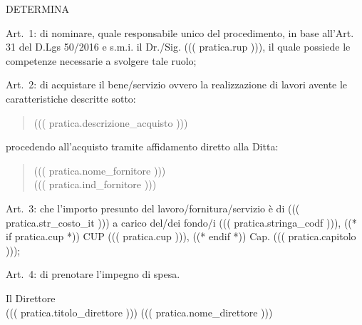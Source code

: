 \documentclass[a4paper,12pt]{letter}
\begin{document}
\begin{center}
DETERMINA
\end{center}

\begin{list}{VALUTATA}{}
\item[Art.~1:] di nominare, quale responsabile unico del procedimento, in base 
           all'Art. 31 del D.Lgs 50/2016 e s.m.i. il Dr./Sig. ((( pratica.rup ))),
           il quale possiede le competenze necessarie a svolgere tale ruolo; 
\item[Art.~2:] di acquistare il bene/servizio ovvero la realizzazione di lavori
        avente le caratteristiche descritte sotto:
\begin{quote}
            ((( pratica.descrizione_acquisto )))
\end{quote}

procedendo all'acquisto tramite affidamento diretto alla Ditta: 

\begin{quote}
((( pratica.nome_fornitore )))\\
((( pratica.ind_fornitore )))
\end{quote}


\item[Art.~3:] che l'importo presunto del lavoro/fornitura/servizio è di 
((( pratica.str_costo_it )))
a carico del/dei fondo/i ((( pratica.stringa_codf ))), ((* if pratica.cup *)) CUP ((( pratica.cup ))), ((* endif *)) Cap. ((( pratica.capitolo ))); 

\item[Art.~4:] di prenotare l'impegno di spesa. 
\end{list}

\vspace{0.5cm}

\begin{flushright}
\begin{minipage}[t]{6cm}
\begin{center}
Il Direttore \\
((( pratica.titolo_direttore ))) ((( pratica.nome_direttore )))
\end{center}
\end{minipage}
\end{flushright}
\end{document}
